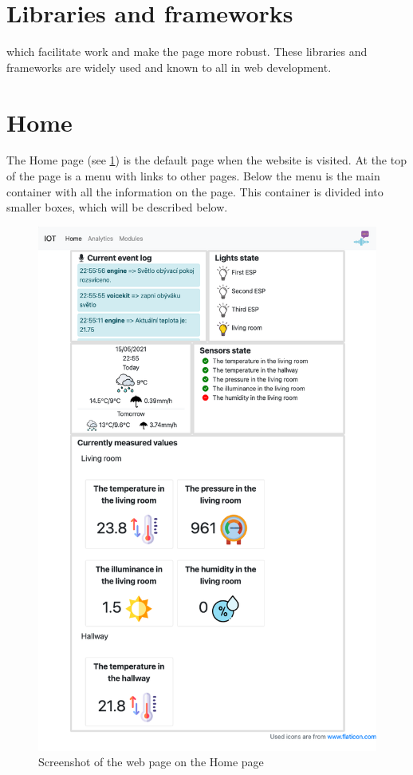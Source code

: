 \section{Libraries and frameworks} \label{section:libraries_and_frameworks}

which facilitate work and make the page more robust. These libraries and frameworks are widely used and known to all in web development. 


\section{Home}

The Home page (see \cref{fig:web_home}) is the default page when the website is visited. At the top of the page is a menu with links to other pages. Below the menu is the main container with all the information on the page. This container is divided into smaller boxes, which will be described below.

\begin{figure}[H]
    \centering
    \includegraphics[width=\textwidth]{img/web_home.png}
    \caption{Screenshot of the web page on the Home page}
    \label{fig:web_home}
\end{figure}

